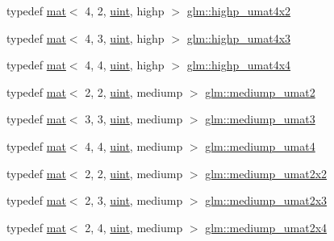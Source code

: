 \begin{DoxyCompactItemize}
\item 
typedef \hyperlink{structglm_1_1mat}{mat}$<$ 4, 2, \hyperlink{group__core__precision_ga4fd29415871152bfb5abd588334147c8}{uint}, highp $>$ \hyperlink{group__gtc__matrix__integer_gaf56fa20818ea9c18fd0a4a8bf141a738}{glm\+::highp\+\_\+umat4x2}
\item 
typedef \hyperlink{structglm_1_1mat}{mat}$<$ 4, 3, \hyperlink{group__core__precision_ga4fd29415871152bfb5abd588334147c8}{uint}, highp $>$ \hyperlink{group__gtc__matrix__integer_gaf89b61119da7856a0867a43d6c25913a}{glm\+::highp\+\_\+umat4x3}
\item 
typedef \hyperlink{structglm_1_1mat}{mat}$<$ 4, 4, \hyperlink{group__core__precision_ga4fd29415871152bfb5abd588334147c8}{uint}, highp $>$ \hyperlink{group__gtc__matrix__integer_gada50011594ccf358c9eafe49ff07999f}{glm\+::highp\+\_\+umat4x4}
\item 
typedef \hyperlink{structglm_1_1mat}{mat}$<$ 2, 2, \hyperlink{group__core__precision_ga4fd29415871152bfb5abd588334147c8}{uint}, mediump $>$ \hyperlink{group__gtc__matrix__integer_gaafd6d236ce051d138e3fdf53de3813e6}{glm\+::mediump\+\_\+umat2}
\item 
typedef \hyperlink{structglm_1_1mat}{mat}$<$ 3, 3, \hyperlink{group__core__precision_ga4fd29415871152bfb5abd588334147c8}{uint}, mediump $>$ \hyperlink{group__gtc__matrix__integer_gaa677ebd95702fc95054de7a4fb4c907f}{glm\+::mediump\+\_\+umat3}
\item 
typedef \hyperlink{structglm_1_1mat}{mat}$<$ 4, 4, \hyperlink{group__core__precision_ga4fd29415871152bfb5abd588334147c8}{uint}, mediump $>$ \hyperlink{group__gtc__matrix__integer_ga0653e9571754f1e33203290aaf3dfc5d}{glm\+::mediump\+\_\+umat4}
\item 
typedef \hyperlink{structglm_1_1mat}{mat}$<$ 2, 2, \hyperlink{group__core__precision_ga4fd29415871152bfb5abd588334147c8}{uint}, mediump $>$ \hyperlink{group__gtc__matrix__integer_ga539a528818569c17e68e77afce7755c2}{glm\+::mediump\+\_\+umat2x2}
\item 
typedef \hyperlink{structglm_1_1mat}{mat}$<$ 2, 3, \hyperlink{group__core__precision_ga4fd29415871152bfb5abd588334147c8}{uint}, mediump $>$ \hyperlink{group__gtc__matrix__integer_ga15d2790e10b27b145cd748abffde8968}{glm\+::mediump\+\_\+umat2x3}
\item 
typedef \hyperlink{structglm_1_1mat}{mat}$<$ 2, 4, \hyperlink{group__core__precision_ga4fd29415871152bfb5abd588334147c8}{uint}, mediump $>$ \hyperlink{group__gtc__matrix__integer_gae060f3b73abab278da912329a0a221bc}{glm\+::mediump\+\_\+umat2x4}

\end{DoxyCompactItemize}
